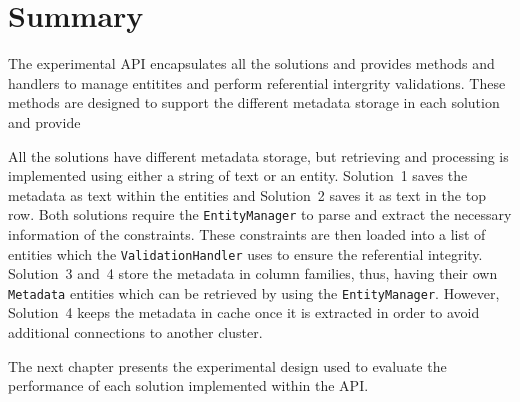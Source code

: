 % 
% 
% 
% 
%  
% 
%   

\section{Summary}\label{s:Implementation-summary}


The experimental \ac{API} encapsulates all the solutions and provides methods
and handlers to manage entitites and perform referential intergrity validations.
These methods are designed to support the different metadata storage in each
solution and provide 

 All the solutions have
different metadata storage, but retrieving and processing  is implemented using either a string of text or an entity.
Solution~1 saves the metadata as text within the entities and Solution~2 saves
it as text in the top row. Both solutions require the \texttt{EntityManager} to
parse and extract the necessary information of the constraints. These
constraints are then loaded into a list of entities which the
\texttt{ValidationHandler} uses to ensure the referential integrity.
 Solution~3
 and~4 store the metadata in column families, thus, having their own
 \texttt{Metadata} entities which can be retrieved by using the
 \texttt{EntityManager}.  However, Solution~4 keeps the metadata in cache once
 it is extracted in order to avoid additional connections to another cluster.

The next chapter presents the experimental design used to evaluate  the
performance of each solution implemented within the \ac{API}.


